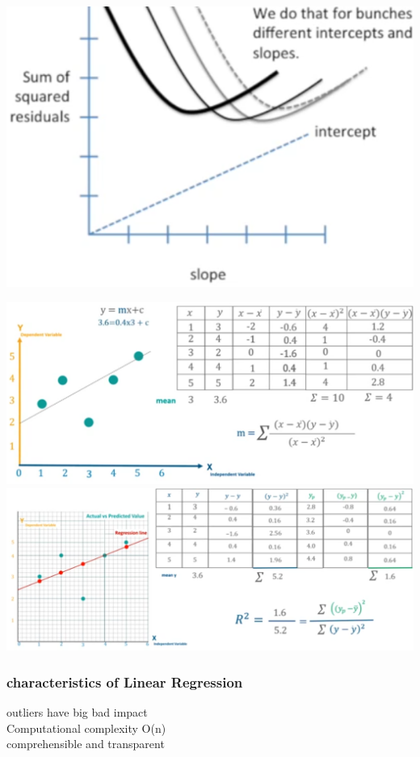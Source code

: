 \documentclass{beamer}
\begin{document}
\begin{frame}
	\includegraphics[scale=0.15]{regression/linear3}\\	
\end{frame}


\begin{frame}%
	\includegraphics[scale=0.27]{regression/linearmanual}
	\includegraphics[scale=0.27]{regression/linearmanualrsq}
\end{frame}

\begin{frame}\frametitle{characteristics of Linear Regression}
	outliers have big bad impact\\
	Computational complexity O(n)\\
	comprehensible and transparent
\end{frame}
\end{document}
